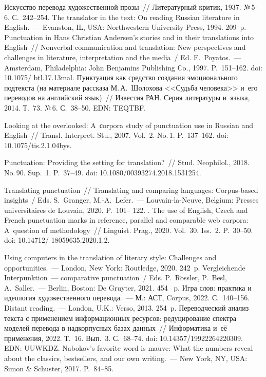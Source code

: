 \begin{multicols}{2}
{{\begin{thebibliography}{99}
 Искусство перевода художественной прозы~// 
Литературный критик, 1937. №\,5-6. С.~242--254.
 The translator in the text: On reading Russian literature in English.~--- Evanston, IL, USA: Northwestern University Press, 1994. 209~p.
 Punctuation in Hans Christian Andersen's stories and in 
their translations into English~// Nonverbal communication and translation: New 
perspectives and challenges in literature, interpretation and the media~/ Ed. 
F.~Poyatos.~--- Amsterdam, Philadelphia: John 
Benjamins Publishing Co., 1997. P.~151--162. doi: 10.1075/ btl.17.13mal.
 Пунктуация как средство создания эмоционального 
подтекста (на материале рассказа М.\,А.~Шолохова <<Судьба человека>> 
и~его переводов на английский язык)~// Известия РАН. Серия литературы 
и~языка, 2014. Т.~73. №\,6. 
 С.~38--50. EDN: TEQTBF.

 Looking at the overlooked: A~сorpora study of 
punctuation use in Russian and English~// Transl. Interpret. Stu., 
2007. Vol.~2. No.\,1. P.~137--162. doi: 10.1075/tis.2.1.04bys.

 Punctuation: Providing the setting for translation?~// Stud. 
Neophilol., 2018. No.\,90. Sup.~1. P.~37--49. doi: 
10.1080/00393274.2018.1531254.

 Translating punctuation~// Translating and 
comparing languages: Corpus-based insights~/ Eds. S.~Granger, M.-A.~Lefer.~--- 
Louvain-la-Neuve, Belgium: Presses universitaires de Louvain, 2020. P.~101--
122.
. The use of 
English, Czech and French punctuation marks in reference, parallel and 
comparable web corpora: A~question of methodology~// Linguist. Prag., 
2020. Vol.~30. Iss.~2. P.~30--50. doi: 10.14712/ 18059635.2020.1.2.

 Using computers in the translation of literary style: Challenges 
and opportunities.~--- London, New York: Routledge, 2020. 
242~p.
Vergleichende Interpunktion~--- comparative punctuation~/ Eds. 
P.~R$\ddot{\mbox{o}}$ssler, P.~Besl, A.~Saller.~--- Berlin, Boston: De Gruyter, 2021. 454~ p.
 Игра слов: практика и идеология художественного перевода.~--- М.: 
АСТ, Corpus, 2022. С.~140--156.
 Distant reading.~--- London, U.K.: Verso, 2013. 254~p.
 Переводческий анализ текста с применением 
информационных ресурсов: редуцирование спектра моделей перевода в 
надкорпусных базах данных~// Информатика и~её применения, 2022. Т.~16. 
Вып.~3. С.~68--74. doi: 10.14357/19922264220309. EDN: UUWKDZ.
 Nabokov's favorite word is mauve: What the numbers reveal about 
the classics, bestsellers, and our own writing.~--- New York, NY, USA: Simon \& 
Schuster, 2017. P.~84--85.


\end{thebibliography}}}
\end{multicols}
